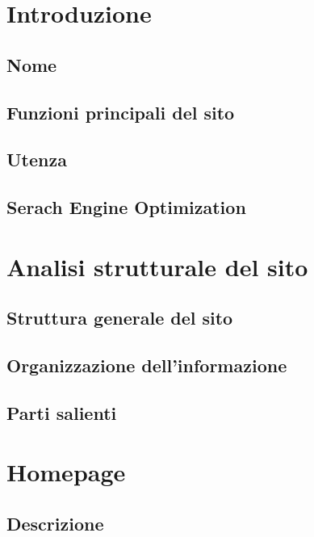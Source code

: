 \documentclass[a4paper, oneside, openany, dvipsnames, table]{article}
\begin{document}
\copertina
\tableofcontents
\newpage
\section{Introduzione}
	\subsection{Nome}
		
	\subsection{Funzioni principali del sito}
		
	\subsection{Utenza}
		
	\subsection{Serach Engine Optimization}
		
	
	
\newpage
\section{Analisi strutturale del sito}
	
	\subsection{Struttura generale del sito}
		
	\subsection{Organizzazione dell'informazione}
		
	\subsection{Parti salienti}
		
	

\newpage
\section{Homepage}
	
	\subsection{Descrizione}
		
\end{document}
